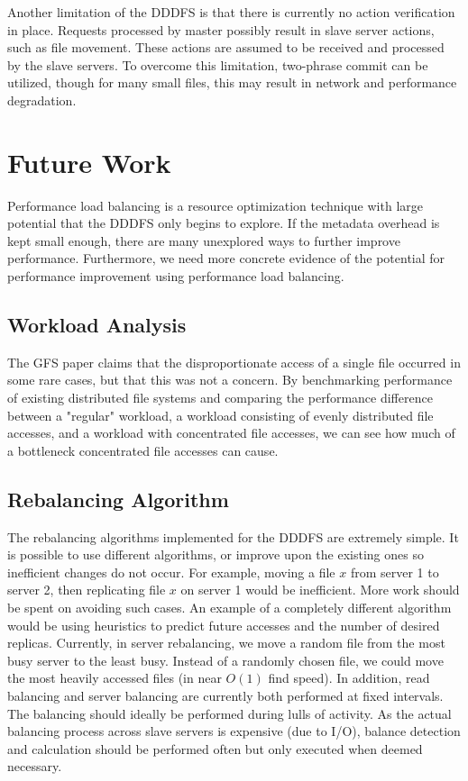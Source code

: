\documentclass[twoside]{article}
\begin{document}
\begin{multicols}{2}
Another limitation of the DDDFS is that there is currently no action verification in place. Requests processed by master possibly result in slave server actions, such as file movement. These actions are assumed to be received and processed by the slave servers. To overcome this limitation, two-phrase commit can be utilized, though for many small files, this may result in network and performance degradation.

\section{Future Work}

Performance load balancing is a resource optimization technique with large potential that the DDDFS only begins to explore. If the metadata overhead is kept small enough, there are many unexplored ways to further improve performance. Furthermore, we need more concrete evidence of the potential for performance improvement using performance load balancing.

\subsection*{Workload Analysis}
The GFS paper claims that the disproportionate access of a single file occurred in some rare cases, but that this was not a concern. By benchmarking performance of existing distributed file systems and comparing the performance difference between a "regular" workload, a workload consisting of evenly distributed file accesses, and a workload with concentrated file accesses, we can see how much of a bottleneck concentrated file accesses can cause.

\subsection*{Rebalancing Algorithm}
The rebalancing algorithms implemented for the DDDFS are extremely simple. It is possible to use different algorithms, or improve upon the existing ones so inefficient changes do not occur. For example, moving a file $x$ from server 1 to server 2, then replicating file $x$ on server 1 would be inefficient. More work should be spent on avoiding such cases. An example of a completely different algorithm would be using heuristics to predict future accesses and the number of desired replicas. Currently, in server rebalancing, we move a random file from the most busy server to the least busy. Instead of a randomly chosen file, we could move the most heavily accessed files (in near $O(1)$ find speed). In addition, read balancing and server balancing are currently both performed at fixed intervals. The balancing should ideally be performed during lulls of activity. As the actual balancing process across slave servers is expensive (due to I/O), balance detection and calculation should be performed often but only executed when deemed necessary. 


\end{multicols}
\end{document}
